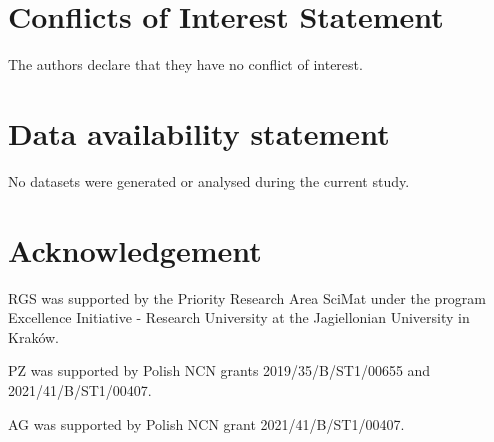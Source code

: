 \documentclass[a4paper,10pt]{article}
\theoremstyle{definition}
\begin{document}





\appendix


%










%
%

%

\section*{Conflicts of Interest Statement}
The authors declare that they have no conflict of interest.

\section*{Data availability statement}
No datasets were generated or analysed during the current study.

\section*{Acknowledgement}
RGS was supported by the Priority Research Area SciMat under the program Excellence Initiative - Research University at the Jagiellonian University in Krak\'ow.

PZ was  supported by Polish NCN grants 2019/35/B/ST1/00655  and 2021/41/B/ST1/00407.

AG was supported by Polish NCN grant 2021/41/B/ST1/00407.

\end{document}
